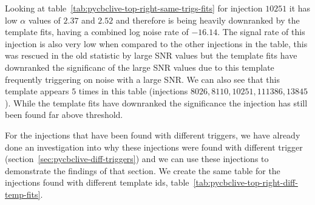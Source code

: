 Looking at table~\ref{tab:pycbclive-top-right-same-trigs-fits} for injection $10251$ it has low $\alpha$ values of $2.37$ and $2.52$ and therefore is being heavily downranked by the template fits, having a combined log noise rate of $-16.14$. The signal rate of this injection is also very low when compared to the other injections in the table, this was rescued in the old statistic by large SNR values but the template fits have downranked the significanc of the large SNR values due to this template frequently triggering on noise with a large SNR. We can also see that this template appears $5$ times in this table (injections $8026, 8110, 10251, 111386, 13845$). While the template fits have downranked the significance the injection has still been found far above threshold.

For the injections that have been found with different triggers, we have already done an investigation into why these injections were found with different trigger (section~\ref{sec:pycbclive-diff-triggers}) and we can use these injections to demonstrate the findings of that section. We create the same table for the injections found with different template ids, table~\ref{tab:pycbclive-top-right-diff-temp-fits}.
%
